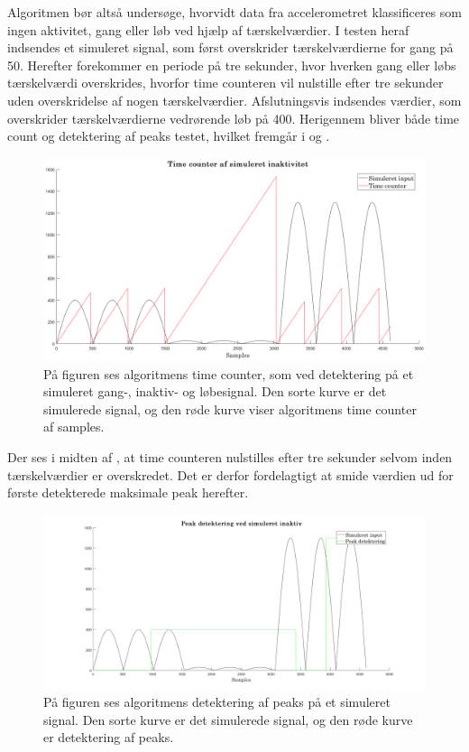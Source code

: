 Algoritmen bør altså undersøge, hvorvidt data fra accelerometret klassificeres som ingen aktivitet, gang eller løb ved hjælp af tærskelværdier. I testen heraf indsendes et simuleret signal, som først overskrider tærskelværdierne for gang på 50. Herefter forekommer en periode på tre sekunder, hvor hverken gang eller løbs tærskelværdi overskrides, hvorfor time counteren vil nulstille efter tre sekunder uden overskridelse af nogen tærskelværdier. Afslutningsvis indsendes værdier, som overskrider tærskelværdierne vedrørende løb på 400. Herigennem bliver både time count og detektering af peaks testet, hvilket fremgår i  og . 
\begin{figure}[H]
	\centering
	\includegraphics[scale=0.27]{figures/cDesign/test_timecount_inaktiv.png}
	\caption{På figuren ses algoritmens time counter, som ved detektering på et simuleret gang-, inaktiv- og løbesignal. Den sorte kurve er det simulerede signal, og den røde kurve viser algoritmens time counter af samples.}
	\label{fig:test_inaktiv_time}
\end{figure}\vspace{-0.25cm}
Der ses i midten af , at time counteren nulstilles efter tre sekunder selvom inden tærskelværdier er overskredet. Det er derfor fordelagtigt at smide værdien ud for første detekterede maksimale peak herefter.
\begin{figure}[H]
	\centering
	\includegraphics[width=.7\textwidth]{figures/cDesign/test_peak_inaktiv.png}
	\caption{På figuren ses algoritmens detektering af peaks på et simuleret signal. Den sorte kurve er det simulerede signal, og den røde kurve er detektering af peaks.}
	\label{fig:test_inaktiv_peak}
\end{figure}\vspace{-0.25cm}
